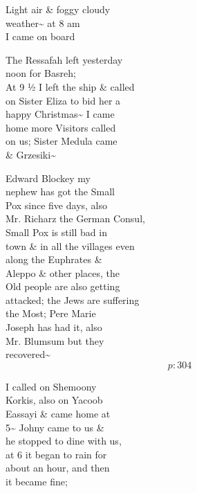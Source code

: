 \documentclass{report}
\begin{document}


	\par{
 	Light air \& foggy cloudy\ \\weather\~{} at 8 am\ \\I came on board\ \\
	}

	\par{
 	The Ressafah left yesterday\ \\noon for Basreh;\ \\At 9 ½ I left the ship \& called\ \\on Sister Eliza to bid her a\ \\happy Christmas\~{} I came\ \\home more Visitors called\ \\on us; Sister Medula came\ \\\& Grzesiki\~{}\ \\
	}

	\par{
 	Edward Blockey my\ \\nephew has got the Small\ \\Pox since five days, also\ \\Mr. Richarz the German Consul,\ \\Small Pox is still bad in\ \\town \& in all the villages even\ \\along the Euphrates \&\ \\Aleppo \& other places, the\ \\Old people are also getting\ \\attacked; the Jews are suffering\ \\the Most; Pere Marie\ \\Joseph has had it, also\ \\Mr. Blumsum but they\ \\recovered\~{}\ \\
  \[p: 304 \]

	}

	\par{
 	I called on Shemoony\ \\Korkis, also on Yacoob\ \\Eassayi \& came home at\ \\5\~{} Johny came to us \&\ \\he stopped to dine with us,\ \\at 6 it began to rain for\ \\about an hour, and then\ \\it became fine;\ \\
	}
\end{document}
